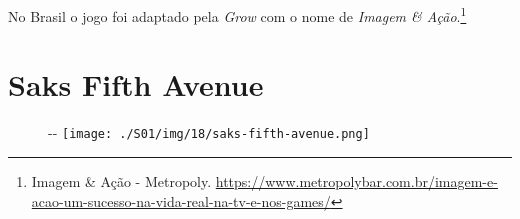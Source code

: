 No Brasil o jogo foi adaptado pela \emph{Grow} com o nome de
\emph{Imagem \& Ação}.\footnote{\sloppy Imagem \& Ação - Metropoly. \url{https://www.metropolybar.com.br/imagem-e-acao-um-sucesso-na-vida-real-na-tv-e-nos-games/}}

\hypertarget{saks-fifth-avenue}{%
\section{Saks Fifth Avenue}\label{saks-fifth-avenue}}

\begin{figure}[!ht]
  \begin{adjustwidth}{-\oddsidemargin-1in}{-\rightmargin}
    \centering
    \texttt{[image: ./S01/img/18/saks-fifth-avenue.png]}
  \end{adjustwidth}
\end{figure}

